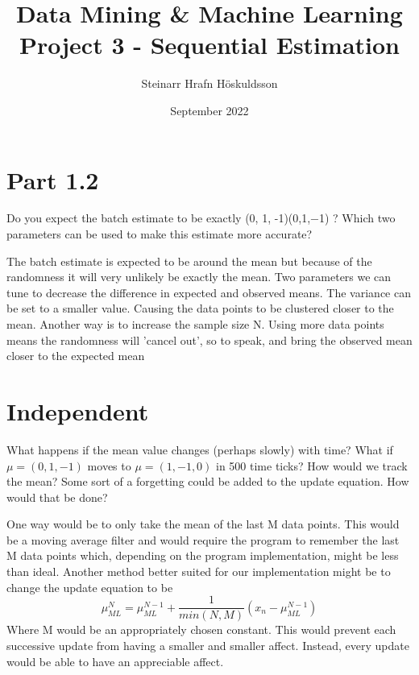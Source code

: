 \documentclass{article}
\title{Data Mining \& Machine Learning \\ \large Project 3 - Sequential Estimation}
\author{Steinarr Hrafn Höskuldsson}
\date{September 2022}
\newcommand{\mycomment}[1]{}
\begin{document}
\maketitle
\mycomment{
\begin{figure}[h]
    \centering
    \texttt{[image: LAB3/Basic1.png]}
    \caption{"Switch test" Breadboard set up}
    \label{fig:Switch_test}
\end{figure}



}
\section*{Part 1.2}
\begin{quoting}
Do you expect the batch estimate to be exactly (0, 1, -1)(0,1,−1) ? Which two parameters can be used to make this estimate more accurate?
\end{quoting}
The batch estimate is expected to be around the mean but because of the randomness it will very unlikely be exactly the mean. Two parameters we can tune to decrease the difference in expected and observed means. The variance can be set to a smaller value. Causing the data points to be clustered closer to the mean. Another way is to increase the sample size N. Using more data points means the randomness will 'cancel out', so to speak, and bring the observed mean closer to the expected mean

\section*{Independent}
\begin{quoting}
What happens if the mean value changes (perhaps slowly) with time? What if $\mu =(0,1,-1)$ moves to $\mu=(1,-1,0)$ in 500 time ticks? How would we track the mean? Some sort of a forgetting could be added to the update equation. How would that be done?
\end{quoting}

One way would be to only take the mean of the last M data points. This would be a moving average filter and would require the program to remember the last M data points which, depending on the program implementation, might be less than ideal. Another method better suited for our implementation might be to change the update equation to be 
\[\mu_{ML}^{N} = \mu_{ML}^{N-1} + \frac{1}{min(N, M)}(x_n - \mu_{ML}^{N-1})\]
Where M would be an appropriately chosen constant. This would prevent each successive update from having a smaller and smaller affect. Instead, every update would be able to have an appreciable affect.
\end{document}
